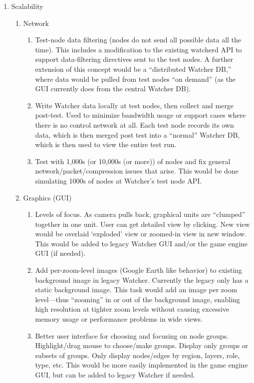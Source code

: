 \documentclass{report}
\begin{document}
\begin{enumerate}
\item Scalability 
\begin{enumerate}
    \item Network 
    \begin{enumerate}
        \item Test-node data filtering (nodes do not send all possible data all the time). This includes a modification to the existing watcherd API to support data-filtering directives sent to the test nodes.  A further extension of this concept would be a ``distributed Watcher DB,'' where data would be pulled from test nodes ``on demand'' (as the GUI currently does from the central Watcher DB).
        \item Write Watcher data locally at test nodes, then collect and merge post-test. Used to minimize bandwidth usage or support cases where there is no control network at all. Each test node records its own data, which is then merged post test into a ``normal'' Watcher DB, which is then used to view the entire test run.
         \item Test with 1,000s (or 10,000s (or more)) of nodes and fix general network\slash packet\slash compression issues that arise. This would be done simulating 1000s of nodes at Watcher's test node API. 
    \end{enumerate}
    \item Graphics (GUI) 
    \begin{enumerate}
        \item Levels of focus. As camera pulls back, graphical units are ``clumped'' together in one unit. User can get detailed view by clicking. New view would be overlaid `exploded' view or zoomed-in view in new window. This would be added to legacy Watcher GUI and/or the game engine GUI (if needed). 
        \item Add per-zoom-level images (Google Earth like behavior) to existing background image in legacy Watcher. Currently the legacy only has a static background image. This task would add an image per zoom level---thus ``zooming'' in or out of the background image, enabling high resolution at tighter zoom levels without causing excessive memory usage or performance problems in wide views. 
        \item Better user interface for choosing and focusing on node groups. Highlight\slash drag mouse to choose\slash make groups. Display only groups or subsets of groups. Only display nodes\slash edges by region, layers, role, type, etc. This would be more easily implemented in the game engine GUI, but can be added to legacy Watcher if needed.

\end{enumerate}
\end{enumerate}
\end{enumerate}
\end{document}
